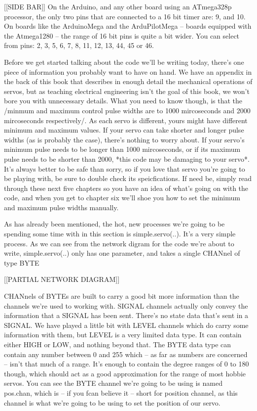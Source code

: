 [[SIDE BAR]]
On the Arduino, and any other board using an ATmega328p processor, the only two pins that are connected to a 16 bit timer are:
9, and 10.
On boards like the ArduinoMega and the ArduPilotMega -- boards equipped with the Atmega1280 -- the range of 16 bit pins is quite a bit wider. You can select from pins:
2, 3, 5, 6, 7, 8, 11, 12, 13, 44, 45 or 46.


\CODE


	Before we get started talking about the code we'll be writing today, there's one piece of information you probably want to have on hand. We have an appendix in the back of this book that describes in enough detail the mechanical operations of servos, but as teaching electrical engineering isn't the goal of this book, we won't bore you with unnecessary details. What you need to know though, is that the /minmum and maximum control pulse widths are to 1000 mircoseconds and 2000 mircoseconds respectively/. As each servo is different, yours might have different minimum and maximum values. If your servo can take shorter and longer pulse widths (as is probably the case), there's nothing to worry about. If your servo's minimum pulse needs to be longer than 1000 mircoseconds, or if its maximum pulse needs to be shorter than 2000, *this code may be damaging to your servo*.
	It's always better to be safe than sorry, so if you love that servo you're going to be playing with, be sure to double check its speicfications. If need be, simply read through these next five chapters so you have an idea of what's going on with the code, and when you get to chapter six we'll shoe you how to set the minimum and maximum pulse widths manually.


	As has already been mentioned, the hot, new processes we're going to be spending some time with in this section is simple.servo(..). It's a very simple process. As we can see from the network digram for the code we're about to write, simple.servo(..) only has one parameter, and takes a single CHANnel of type BYTE

	[[PARTIAL NETWORK DIAGRAM]]

	CHANnels of BYTEs are built to carry a good bit more information than the channels we're used to working with. SIGNAL channels actually only convey the information that a SIGNAL has been sent. There's no state data that's sent in a SIGNAL. We have played a little bit with LEVEL channels which do carry some information with them, but LEVEL is a very limited data type. It can contain either HIGH or LOW, and nothing beyond that. The BYTE data type can contain any number between 0 and 255 which -- as far as numbers are concerned -- isn't that much of a range. It's enough to contain the degree ranges of 0 to 180 though, which should act as a good approximation for the range of most hobbie servos. You can see the BYTE channel we're going to be using is named pos.chan, which is -- if you fcan believe it -- short for position channel, as this channel is what we're going to be using to set the position of our servo.

